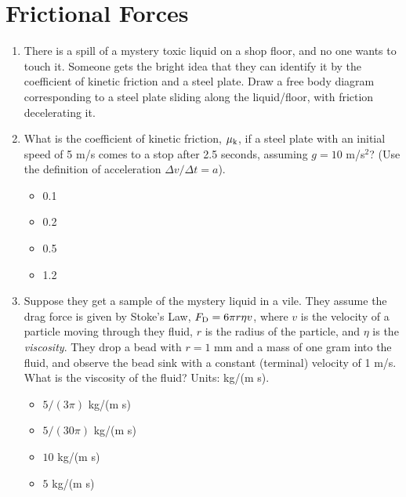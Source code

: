 \documentclass[10pt]{article}
\begin{document}
\section{Frictional Forces}
\begin{enumerate}
\item There is a spill of a mystery toxic liquid on a shop floor, and no one wants to touch it.  Someone gets the bright idea that they can identify it by the coefficient of kinetic friction and a steel plate.  Draw a free body diagram corresponding to a steel plate sliding along the liquid/floor, with friction decelerating it.\vspace{2.5cm}
\item What is the coefficient of kinetic friction, $\mu_{\rm k}$, if a steel plate with an initial speed of 5 m/s comes to a stop after 2.5 seconds, assuming $g = 10$ m/s$^2$?  (Use the definition of acceleration $\Delta v/\Delta t = a$).
\begin{itemize}
\item 0.1
\item 0.2
\item 0.5
\item 1.2
\end{itemize}
\item Suppose they get a sample of the mystery liquid in a vile.  They assume the drag force is given by Stoke's Law, $F_{\rm D} = 6\pi r \eta v$, where $v$ is the velocity of a particle moving through they fluid, $r$ is the radius of the particle, and $\eta$ is the \textit{viscosity}.  They drop a bead with $r = 1$ mm and a mass of one gram into the fluid, and observe the bead sink with a constant (terminal) velocity of 1 m/s.  What is the viscosity of the fluid?  Units: kg/(m s).
\begin{itemize}
\item $5/(3\pi)$ kg/(m s)
\item $5/(30\pi)$ kg/(m s)
\item $10$ kg/(m s)
\item $5$ kg/(m s)
\end{itemize}
\end{enumerate}
\end{document}
